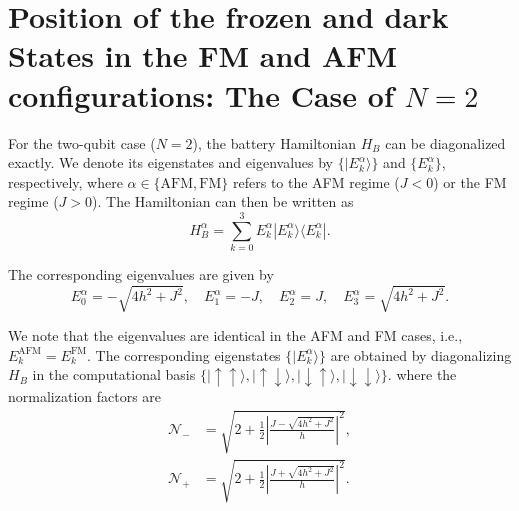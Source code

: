 \documentclass[aps,superscriptaddress,twocolumn,pre,longbibliography,floatfix]{revtex4-1}
\begin{document}
	\section{Position of the frozen and dark States in the FM and AFM configurations: The Case of $N=2$} \label{appendix.dark_stat and frozen state position}
	For the two-qubit case ($N=2$), the battery Hamiltonian $H_B$ can be diagonalized exactly. We denote its eigenstates and eigenvalues by $\{|E_k^{\alpha}\rangle\}$ and $\{E_k^{\alpha}\}$, respectively, where $\alpha \in \{\mathrm{AFM},\mathrm{FM}\}$ refers to the AFM regime ($J<0$) or the FM regime ($J>0$). The Hamiltonian can then be written as
	\begin{equation}
		H_B^{\alpha}
		=
		\sum_{k=0}^{3}
		E_k^{\alpha}
		|E_k^{\alpha}\rangle
		\langle E_k^{\alpha}|.
	\end{equation}
	
	The corresponding eigenvalues are given by
	\begin{equation}
		E_0^{\alpha}=-\sqrt{4h^2+J^2},
		\quad
		E_1^{\alpha}=-J,
		\quad
		E_2^{\alpha}=J,
		\quad
		E_3^{\alpha}=\sqrt{4h^2+J^2}.
	\end{equation}
	
	We note that the eigenvalues are identical in the AFM and FM cases, i.e.,
	$E_k^{\mathrm{AFM}}=E_k^{\mathrm{FM}}$. The corresponding eigenstates
	$\{|E_k^\alpha\rangle\}$ are obtained by diagonalizing $H_B$ in the
	computational basis
	$\{|\uparrow\uparrow\rangle,|\uparrow\downarrow\rangle,
	|\downarrow\uparrow\rangle,|\downarrow\downarrow\rangle\}$.
	where the normalization factors are
	\begin{align}
		\mathcal{N}_{-}
		&=
		\sqrt{
			2+
			\frac{1}{2}
			\left|
			\frac{J-\sqrt{4h^2+J^2}}{h}
			\right|^2
		},
		\\
		\mathcal{N}_{+}
		&=
		\sqrt{
			2+
			\frac{1}{2}
			\left|
			\frac{J+\sqrt{4h^2+J^2}}{h}
			\right|^2
		}.
	\end{align}
	
\end{document}
